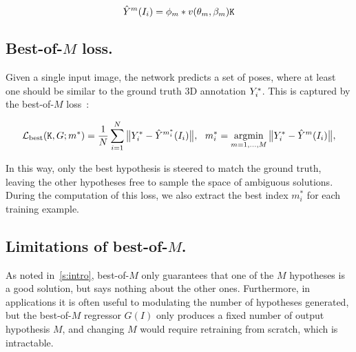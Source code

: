 \begin{equation}
  \hat Y^{m}(I_{i}) = \phi_{m} * v(\theta_{m},\beta_{m})\mathtt{K}
\end{equation}

\subsection{Best-of-$M$ loss.}
Given a single input image, the network predicts a set of poses, where at least one should be similar to the ground truth 3D annotation $Y^{*}_{i}$.
This is captured by the best-of-$M$ loss~\cite{guzman2012multiple}:

\begin{equation}\label{e:loss-best}
  \mathcal{L}_\text{best}(\jointselect,G;m^*)
  =
  \frac{1}{N}
  \sum_{i=1}^N
  \big \| \inputjtsthree_{i}- \hat Y^{m_i^*}(I_i) \big \|,
  ~~
  m_i^*
  =
  \operatornamewithlimits{argmin}_{m=1,\dots,M}
  \big \| \inputjtsthree_{i} -  \hat Y^{m}(I_i) \big \|,
\end{equation}

In this way, only the best hypothesis is steered to match the ground truth, leaving the other hypotheses free to sample the space of ambiguous solutions.
During the computation of this loss, we also extract the best index $m^*_i$ for each training example.

\subsection{Limitations of best-of-$M$.}

As noted in~\cref{s:intro}, best-of-$M$ only guarantees that one of the $M$ hypotheses is a good solution, but says nothing about the other ones.
Furthermore, in applications it is often useful to modulating the number of hypotheses generated, but the best-of-$M$ regressor $G(I)$ only produces a fixed number of output hypothesis $M$, and changing $M$ would require retraining from scratch, which is intractable.


